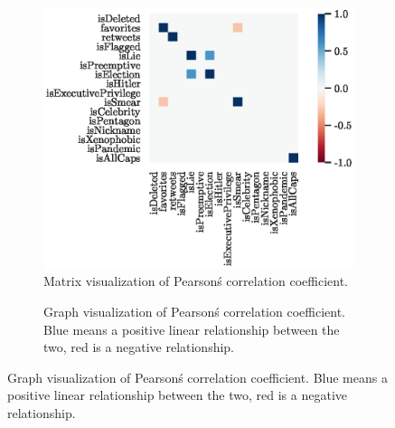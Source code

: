 \documentclass{article}
\begin{document}
    \begin{figure}
         \vspace{-2cm}
         \begin{subfigure}{\textwidth}
             \hspace{-3.0cm}
             \includegraphics{corr_heatmap.eps}
             \caption{Matrix visualization of Pearson\'s correlation coefficient.}
         \end{subfigure}
         \vspace{2cm}
         \begin{subfigure}{\textwidth}
             \hspace{-.6cm}
             
             \caption{Graph visualization of Pearson\'s correlation coefficient. Blue means a positive linear relationship between the two, red is a negative relationship.}
         \end{subfigure}
    \end{figure}
\end{document}
